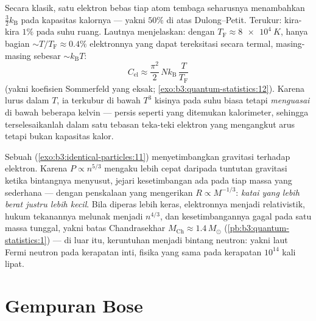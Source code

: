 \begin{example}\label{ex:b3:quantum-statistics:heat}
Secara klasik, satu elektron bebas tiap atom tembaga seharusnya
menambahkan $\tfrac32
k_{\text{B}}$ pada kapasitas kalornya --- yakni $50\%$ di atas
Dulong--Petit. Terukur: kira-kira $1\%$ pada suhu ruang. Lautnya
menjelaskan: dengan $T_{\text{F}} \approx \qty{8e4}{K}$, hanya
bagian $\sim T/T_{\text{F}} \approx 0.4\%$ elektronnya yang dapat
tereksitasi secara termal, masing-masing sebesar $\sim k_{\text{B}}T$:
\[
C_{\text{el}} \approx \frac{\pi^2}{2}\,
Nk_{\text{B}}\,\frac{T}{T_{\text{F}}}
\]
(yakni koefisien Sommerfeld yang eksak;
\cref{exo:b3:quantum-statistics:12}). Karena lurus dalam $T$, ia terkubur
di bawah $T^3$ kisinya pada suhu biasa tetapi
\emph{menguasai} di bawah beberapa kelvin --- persis seperti yang
ditemukan kalorimeter, sehingga terselesaikanlah dalam satu tebasan
teka-teki elektron yang mengangkut arus tetapi bukan kapasitas kalor.
\end{example}

\begin{example}\label{ex:b3:quantum-statistics:dwarf}
Sebuah  (\cref{exo:b3:identical-particles:11})
menyetimbangkan gravitasi terhadap  elektron. Karena $P \propto
n^{5/3}$ mengaku lebih cepat daripada tuntutan gravitasi ketika
bintangnya menyusut, jejari kesetimbangan ada pada tiap massa yang
sederhana --- dengan penskalaan yang mengerikan
$R \propto M^{-1/3}$: \emph{katai yang lebih berat justru lebih
kecil}. Bila diperas lebih keras, elektronnya menjadi relativistik,
hukum tekanannya melunak menjadi $n^{4/3}$, dan kesetimbangannya gagal
pada satu massa tunggal, yakni batas Chandrasekhar $M_{\text{Ch}} \approx
1.4\,M_\odot$ (\cref{pb:b3:quantum-statistics:1}) --- di luar itu,
keruntuhan menjadi bintang neutron: yakni laut Fermi neutron pada
kerapatan inti, fisika yang sama pada kerapatan $10^{14}$ kali lipat.
\end{example}

\section{Gempuran Bose}

